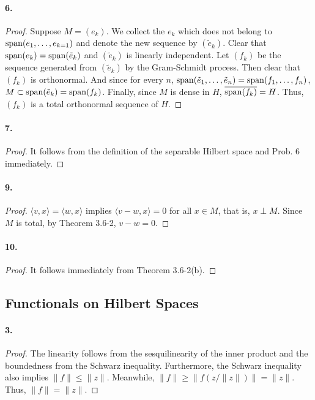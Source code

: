   \paragraph{6.}
  \begin{proof}
    Suppose $M=(e_k)$. We collect the $e_k$ which does not belong to $\operatorname{span}(e_1,
    \dots,e_{k=1})$ and denote the new sequence by $(\tilde{e}_k)$. Clear that
    $\operatorname{span}(e_k)=\operatorname{span}(\tilde{e}_k)$ and $(\tilde{e}_k)$ is linearly independent.
    Let $(f_k)$ be the sequence generated from $(\tilde{e}_k)$ by the
    Gram-Schmidt process. Then clear that $(f_k)$ is orthonormal. And since for
    every $n$, $\operatorname{span}(\tilde{e}_1,\dots,\tilde{e}_n)=\operatorname{span}(f_1,\dots,f_n)$,
    $M\subset\operatorname{span}(\tilde{e}_k)=\operatorname{span}(f_k)$. Finally, since $M$ is dense in $H$,
    $\overline{\operatorname{span}(f_k)}=H$. Thus, $(f_k)$ is a total orthonormal sequence of
    $H$.
  \end{proof}
  
  \paragraph{7.}
  \begin{proof}
    It follows from the definition of the separable Hilbert space and Prob. 6
    immediately.
  \end{proof}
  
  \paragraph{9.}
  \begin{proof}
    $\langle v,x\rangle=\langle w,x\rangle$ implies $\langle v-w,x\rangle=0$ for
    all $x\in M$, that is, $x\perp M$. Since $M$ is total, by Theorem 3.6-2, $v
    -w=0$.
  \end{proof}
  
  \paragraph{10.}
  \begin{proof}
    It follows immediately from Theorem 3.6-2(b).
  \end{proof}

\setcounter{subsection}{7}
\subsection{Functionals on Hilbert Spaces}
  \paragraph{3.}
  \begin{proof}
    The linearity follows from the sesquilinearity of the inner product and the
    boundedness from the Schwarz inequality. Furthermore, the Schwarz inequality
    also implies $\|f\|\le\|z\|$. Meanwhile, $\|f\|\ge\|f(z/\|z\|)\|=\|z\|$. 
    Thus, $\|f\|=\|z\|$.
  \end{proof}
  
